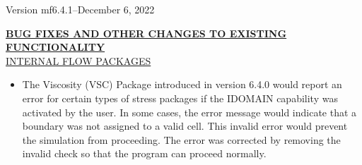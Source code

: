 	
	\item Version mf6.4.1--December 6, 2022
	


	\textbf{\underline{BUG FIXES AND OTHER CHANGES TO EXISTING FUNCTIONALITY}} \\


	\underline{INTERNAL FLOW PACKAGES}
	\begin{itemize}
		\item The Viscosity (VSC) Package introduced in version 6.4.0 would report an error for certain types of stress packages if the IDOMAIN capability was activated by the user.  In some cases, the error message would indicate that a boundary was not assigned to a valid cell.  This invalid error would prevent the simulation from proceeding.  The error was corrected by removing the invalid check so that the program can proceed normally.
	\end{itemize}


